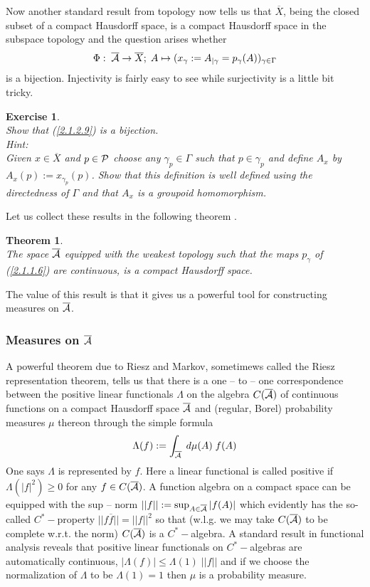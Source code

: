 \documentclass[12pt]{report}
\newtheorem{Theorem}{Theorem}[section]
\newtheorem{Exercise}{Exercise}[section]
\def\be{\begin{equation}}
\def\ee{\end{equation}}
\def\a{{\cal A}}
\def\ab{\overline{\a}}
\begin{document}
Now another standard result from topology now tells us that 
$\overline{X}$,
being the closed subset of a compact Hausdorff space, is a compact
Hausdorff space in the subspace topology and the question arises whether
\be \label{2.1.2.9}
\Phi:\;\ab \to \overline{X};\;A\mapsto 
(x_\gamma:=A_{|\gamma}=p_\gamma(A))_{\gamma\in 
\Gamma}
\ee 
is a bijection. Injectivity is fairly easy to see while surjectivity    
is a little bit tricky.
%
\begin{Exercise} \label{ex2.1.2.3} ~~~~~\\
Show that (\ref{2.1.2.9}) is a bijection.\\
Hint:\\
Given $x\in \overline{X}$ and $p\in {\cal P}$ choose any 
$\gamma_p\in\Gamma$ such that $p\in \gamma_p$ and define $A_x$ by
$A_x(p):=x_{\gamma_p}(p)$. Show that this definition is well defined 
using the directedness of $\Gamma$ and that $A_x$ is a groupoid 
homomorphism.
\end{Exercise}
%
Let us collect these results in the following theorem \cite{33a}.
%
\begin{Theorem}
\label{th2.1.2.1}  ~~~~\\
The space $\ab$ equipped with the weakest topology such that the 
maps $p_\gamma$ of (\ref{2.1.1.6}) are continuous, is a compact Hausdorff 
space.
\end{Theorem}
%
The value of this result is that it gives us a powerful tool for 
constructing measures on $\ab$. 


\subsubsection{Measures on $\ab$}
\label{s2.1.2.3}

A powerful theorem due to Riesz and Markov, sometimews called the 
Riesz representation theorem, tells us that there is a one -- to -- one 
correspondence between the positive linear functionals $\Lambda$ on 
the algebra $C(\ab)$ of continuous functions on a compact Hausdorff space 
$\ab$ and (regular, Borel) probability measures $\mu$ thereon through the 
simple formula
\be \label{2.1.2.10}
\Lambda(f):=\int_{\ab} \;d\mu(A)\;f(A)
\ee
One says $\Lambda$ is represented by $f$. Here a linear functional is 
called positive if $\Lambda(|f|^2)\ge 0$ for any $f\in C(\ab)$. 
A function algebra on a compact space can be equipped with the 
sup -- norm $||f||:=\sup_{A\in \ab} |f(A)|$ which evidently 
has the so-called $C^\ast-$property $||f \overline{f}||=||f||^2$
so that (w.l.g. we may take $C(\ab)$ to be complete w.r.t. the norm)
$C(\ab)$ is a $C^\ast-$algebra. A standard
result in functional analysis reveals that positive linear functionals 
on $C^\ast-$algebras are automatically continuous, $|\Lambda(f)|\le
\Lambda(1)\;||f||$ and if we choose the normalization of $\Lambda$ 
to be $\Lambda(1)=1$ then $\mu$ is a probability measure.
\end{document}
